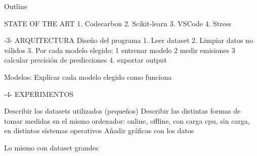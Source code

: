 Outline

STATE OF THE ART
1. Codecarbon
2. Scikit-learn
3. VSCode
4. Stress

-3- ARQUITECTURA
Diseño del programa
1. Leer dataset
2. Limpiar datos no válidos 
3. Por cada modelo elegido:
    1 entrenar modelo
    2 medir emisiones
    3 calcular precisión de predicciones
4. exportar output

Modelos:
Explicar cada modelo elegido como funciona

-4- EXPERIMENTOS

Describir los datasets utilizados (pequeños)
Describir las distintas formas de tomar medidas en el mismo ordenador: online, offline, con carga cpu, sin carga, en distintos sistemas operativos 
Añadir gráficas con los datos

Lo mismo con dataset grandes



